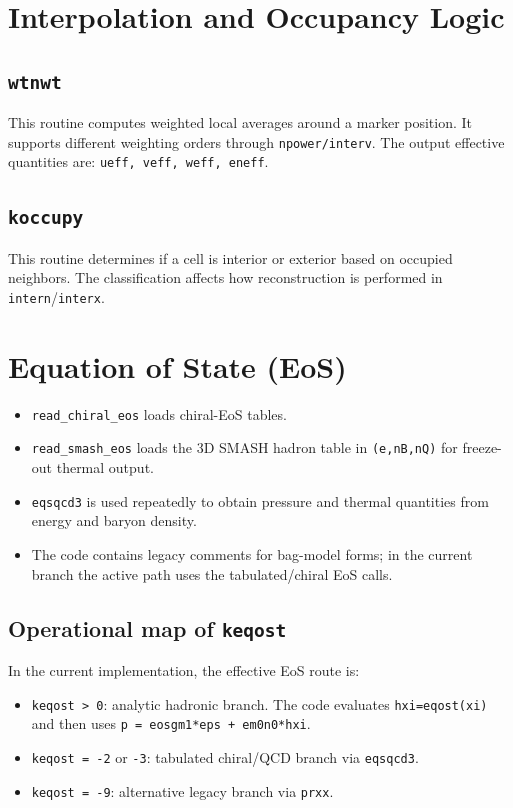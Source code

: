 \documentclass[11pt,a4paper]{article}
\begin{document}
\section{Interpolation and Occupancy Logic}
\subsection{\texttt{wtnwt}}
This routine computes weighted local averages around a marker position.
It supports different weighting orders through \texttt{npower/interv}.
The output effective quantities are:
\texttt{ueff, veff, weff, eneff}.

\subsection{\texttt{koccupy}}
This routine determines if a cell is interior or exterior based on occupied
neighbors. The classification affects how reconstruction is performed in
\texttt{intern}/\texttt{interx}.

\section{Equation of State (EoS)}
\begin{itemize}
\item \texttt{read\_chiral\_eos} loads chiral-EoS tables.
\item \texttt{read\_smash\_eos} loads the 3D SMASH hadron table
      in \texttt{(e,nB,nQ)} for freeze-out thermal output.
\item \texttt{eqsqcd3} is used repeatedly to obtain pressure and thermal
      quantities from energy and baryon density.
\item The code contains legacy comments for bag-model forms; in the current
      branch the active path uses the tabulated/chiral EoS calls.
\end{itemize}

\subsection{Operational map of \texttt{keqost}}
In the current implementation, the effective EoS route is:
\begin{itemize}
\item \texttt{keqost > 0}: analytic hadronic branch. The code evaluates
      \texttt{hxi=eqost(xi)} and then uses
      \texttt{p = eosgm1*eps + em0n0*hxi}.
\item \texttt{keqost = -2} or \texttt{-3}: tabulated chiral/QCD branch via
      \texttt{eqsqcd3}.
\item \texttt{keqost = -9}: alternative legacy branch via \texttt{prxx}.
\end{itemize}
\end{document}
